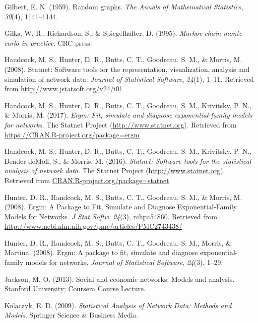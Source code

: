 \documentclass[12pt,twoside]{amherstthesis}
\begin{document}
  \hypertarget{ref-gilbert1959random}{}
  Gilbert, E. N. (1959). Random graphs. \emph{The Annals of Mathematical
  Statistics}, \emph{30}(4), 1141--1144.
  
  \hypertarget{ref-gilks1995markov}{}
  Gilks, W. R., Richardson, S., \& Spiegelhalter, D. (1995). \emph{Markov
  chain monte carlo in practice}. CRC press.
  
  \hypertarget{ref-statnetpackagearticle}{}
  Handcock, M. S., Hunter, D. R., Butts, C. T., Goodreau, S. M., \&
  Morris, M. (2008). Statnet: Software tools for the representation,
  visualization, analysis and simulation of network data. \emph{Journal of
  Statistical Software}, \emph{24}(1), 1--11. Retrieved from
  \url{http://www.jstatsoft.org/v24/i01}
  
  \hypertarget{ref-ergmpackagemanual}{}
  Handcock, M. S., Hunter, D. R., Butts, C. T., Goodreau, S. M.,
  Krivitsky, P. N., \& Morris, M. (2017). \emph{Ergm: Fit, simulate and
  diagnose exponential-family models for networks}. The Statnet Project
  (\url{http://www.statnet.org}). Retrieved from
  \url{https://CRAN.R-project.org/package=ergm}
  
  \hypertarget{ref-statnetpackagemanual}{}
  Handcock, M. S., Hunter, D. R., Butts, C. T., Goodreau, S. M.,
  Krivitsky, P. N., Bender-deMoll, S., \& Morris, M. (2016).
  \emph{Statnet: Software tools for the statistical analysis of network
  data}. The Statnet Project (\url{http://www.statnet.org}). Retrieved
  from \url{CRAN.R-project.org/package=statnet}
  
  \hypertarget{ref-hunter_ergm:_2008}{}
  Hunter, D. R., Handcock, M. S., Butts, C. T., Goodreau, S. M., \&
  Morris, M. (2008). Ergm: A Package to Fit, Simulate and Diagnose
  Exponential-Family Models for Networks. \emph{J Stat Softw},
  \emph{24}(3), nihpa54860. Retrieved from
  \url{http://www.ncbi.nlm.nih.gov/pmc/articles/PMC2743438/}
  
  \hypertarget{ref-ergmpackagearticle}{}
  Hunter, D. R., Handcock, M. S., Butts, C. T., Goodreau, S. M., Morris,
  \& Martina. (2008). Ergm: A package to fit, simulate and diagnose
  exponential-family models for networks. \emph{Journal of Statistical
  Software}, \emph{24}(3), 1--29.
  
  \hypertarget{ref-jacksonergms2013}{}
  Jackson, M. O. (2013). Social and economic networks: Models and
  analysis. Stanford University; Coursera Course Lecture.
  
  \hypertarget{ref-kolaczyk_statistical_2009}{}
  Kolaczyk, E. D. (2009). \emph{Statistical Analysis of Network Data:
  Methods and Models}. Springer Science \& Business Media.
  
\end{document}
